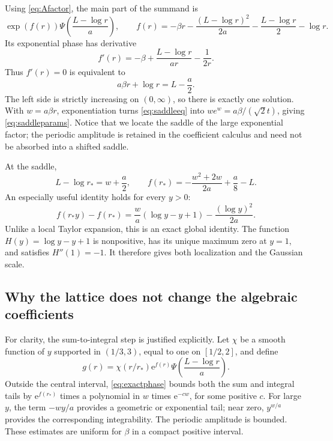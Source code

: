 \documentclass[11pt,oneside]{article}
\numberwithin{equation}{section}
\theoremstyle{definition}
\theoremstyle{remark}
\newcommand{\e}{\mathrm e}
\begin{document}
Using \eqref{eq:Afactor}, the main part of the summand is
\begin{equation}
 \exp(f(r))\Psi\left(\frac{L-\log r}{a}\right),
 \qquad
 f(r)=-\beta r-\frac{(L-\log r)^2}{2a}
                   -\frac{L-\log r}{2}-\log r.
 \label{eq:phasef}
\end{equation}
Its exponential phase has derivative
\[
 f'(r)=-\beta+\frac{L-\log r}{ar}-\frac1{2r}.
\]
Thus \(f'(r)=0\) is equivalent to
\begin{equation}
 a\beta r+\log r=L-\frac a2.
 \label{eq:saddleeq}
\end{equation}
The left side is strictly increasing on \((0,\infty)\), so there is exactly
one solution. With \(w=a\beta r\), exponentiation turns
\eqref{eq:saddleeq} into \(we^w=a\beta/(\sqrt2t)\), giving
\eqref{eq:saddleparams}. Notice that we locate the saddle of the large
exponential factor; the periodic amplitude is retained in the coefficient
calculus and need not be absorbed into a shifted saddle.

At the saddle,
\begin{equation}
 L-\log r_*=w+\frac a2,\qquad
 f(r_*)=-\frac{w^2+2w}{2a}+\frac a8-L.
 \label{eq:fstar}
\end{equation}
An especially useful identity holds for every \(y>0\):
\begin{equation}
 f(r_*y)-f(r_*)=
        \frac wa(\log y-y+1)-\frac{(\log y)^2}{2a}.
 \label{eq:exactphase}
\end{equation}
Unlike a local Taylor expansion, this is an exact global identity. The function
\(H(y)=\log y-y+1\) is nonpositive, has its unique maximum zero at \(y=1\),
and satisfies \(H''(1)=-1\). It therefore gives both localization and the
Gaussian scale.

\subsection{Why the lattice does not change the algebraic coefficients}
For clarity, the sum-to-integral step is justified explicitly. Let \(\chi\)
be a smooth function of \(y\) supported in \((1/3,3)\), equal to one on
\([1/2,2]\), and define
\[
 g(r)=\chi(r/r_*)\e^{f(r)}
                   \Psi\left(\frac{L-\log r}{a}\right).
\]
Outside the central interval, \eqref{eq:exactphase} bounds both the sum and
integral tails by \(\e^{f(r_*)}\) times a polynomial in \(w\) times
\(\e^{-cw}\), for some positive \(c\). For large \(y\), the term
\(-wy/a\) provides a geometric or exponential tail; near zero,
\(y^{w/a}\) provides the corresponding integrability. The periodic amplitude
is bounded. These estimates are uniform for \(\beta\) in a compact positive
interval.
\end{document}
